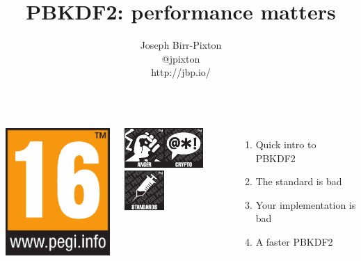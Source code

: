 \documentclass[aspectratio=169]{beamer}
\title[pbkdf2]{PBKDF2: performance matters}
\author{Joseph Birr-Pixton\\
@jpixton\\
http://jbp.io/}
\date{}
\begin{document}
\frame{\titlepage}

\frame
{
  \begin{columns}[c]
      \includegraphics[width=4.7cm]{imgs/16years.png}\vspace{1mm}

      \includegraphics[width=1.5cm]{imgs/anger.png}\hspace{1mm}\includegraphics[width=1.5cm]{imgs/crypto.png}\hspace{1mm}\includegraphics[width=1.5cm]{imgs/standards.png}
      \begin{enumerate}
        \item<1> Quick intro to PBKDF2
        \item<2> The standard is bad
        \item<3> Your implementation is bad
        \item<4> A faster PBKDF2
      \end{enumerate}
  \end{columns}
}
\note{}
\end{document}
